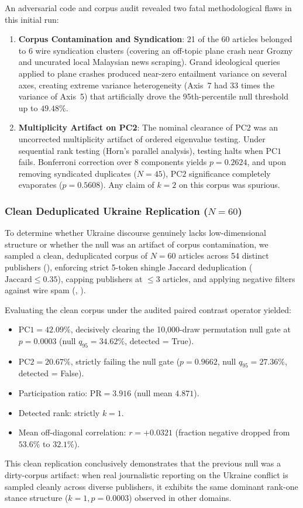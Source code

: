 An adversarial code and corpus audit revealed two fatal methodological flaws in this initial run:
\begin{enumerate}
    \item \textbf{Corpus Contamination and Syndication}: 21 of the 60 articles belonged to 6 wire syndication clusters (covering an off-topic plane crash near Grozny and uncurated local Malaysian news scraping). Grand ideological queries applied to plane crashes produced near-zero entailment variance on several axes, creating extreme variance heterogeneity (Axis~7 had 33 times the variance of Axis~5) that artificially drove the 95th-percentile null threshold up to $49.48\%$.
    \item \textbf{Multiplicity Artifact on PC2}: The nominal clearance of $\mathrm{PC2}$ was an uncorrected multiplicity artifact of ordered eigenvalue testing. Under sequential rank testing (Horn's parallel analysis), testing halts when $\mathrm{PC1}$ fails. Bonferroni correction over 8 components yields $p = 0.2624$, and upon removing syndicated duplicates ($N=45$), $\mathrm{PC2}$ significance completely evaporates ($p = 0.5608$). Any claim of $k=2$ on this corpus was spurious.
\end{enumerate}

\subsubsection{Clean Deduplicated Ukraine Replication ($N=60$)}
To determine whether Ukraine discourse genuinely lacks low-dimensional structure or whether the null was an artifact of corpus contamination, we sampled a clean, deduplicated corpus of $N=60$ articles across 54 distinct publishers (), enforcing strict 5-token shingle Jaccard deduplication ($\text{Jaccard} \le 0.35$), capping publishers at $\le 3$ articles, and applying negative filters against wire spam (, ).

Evaluating the clean corpus under the audited paired contrast operator yielded:
\begin{itemize}
    \item $\mathrm{PC1} = \mathbf{42.09\%}$, decisively clearing the 10,000-draw permutation null gate at $p = 0.0003$ (null $q_{95} = 34.62\%$, detected = True).
    \item $\mathrm{PC2} = \mathbf{20.67\%}$, strictly failing the null gate ($p = 0.9662$, null $q_{95} = 27.36\%$, detected = False).
    \item Participation ratio: $\mathrm{PR} = 3.916$ (null mean $4.871$).
    \item Detected rank: strictly $k = 1$.
    \item Mean off-diagonal correlation: $r = +0.0321$ (fraction negative dropped from $53.6\%$ to $32.1\%$).
\end{itemize}
This clean replication conclusively demonstrates that the previous null was a dirty-corpus artifact: when real journalistic reporting on the Ukraine conflict is sampled cleanly across diverse publishers, it exhibits the same dominant rank-one stance structure ($k=1, p = 0.0003$) observed in other domains.

